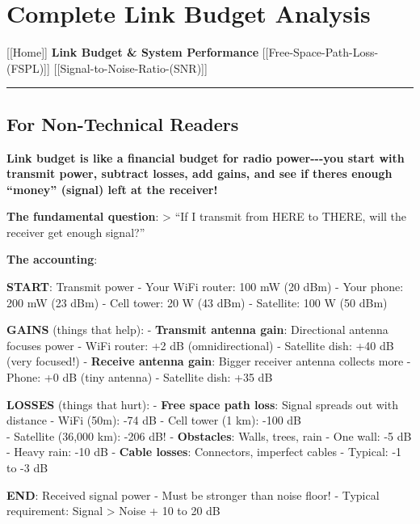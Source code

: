 \section{Complete Link Budget
Analysis}\label{complete-link-budget-analysis}

{[}{[}Home{]}{]} \textbar{} \textbf{Link Budget \& System Performance}
\textbar{} {[}{[}Free-Space-Path-Loss-(FSPL){]}{]} \textbar{}
{[}{[}Signal-to-Noise-Ratio-(SNR){]}{]}

\begin{center}\rule{0.5\linewidth}{0.5pt}\end{center}

\subsection{\texorpdfstring{ For Non-Technical
Readers}{ For Non-Technical Readers}}\label{for-non-technical-readers}

\textbf{Link budget is like a financial budget for radio power-\/-\/-you
start with transmit power, subtract losses, add gains, and see if
there\textquotesingle s enough ``money'' (signal) left at the receiver!}

\textbf{The fundamental question}: \textgreater{} ``If I transmit from
HERE to THERE, will the receiver get enough signal?''

\textbf{The accounting}:

\textbf{START}: Transmit power - Your WiFi router: 100 mW (20 dBm) -
Your phone: 200 mW (23 dBm) - Cell tower: 20 W (43 dBm) - Satellite: 100
W (50 dBm)

\textbf{GAINS} (things that help): - \textbf{ Transmit antenna gain}:
Directional antenna focuses power - WiFi router: +2 dB (omnidirectional)
- Satellite dish: +40 dB (very focused!) - \textbf{ Receive antenna
gain}: Bigger receiver antenna collects more - Phone: +0 dB (tiny
antenna) - Satellite dish: +35 dB

\textbf{LOSSES} (things that hurt): - \textbf{ Free space path loss}:
Signal spreads out with distance - WiFi (50m): -74 dB - Cell tower (1
km): -100 dB\\
- Satellite (36,000 km): -206 dB! - \textbf{ Obstacles}: Walls, trees,
rain - One wall: -5 dB - Heavy rain: -10 dB - \textbf{ Cable losses}:
Connectors, imperfect cables - Typical: -1 to -3 dB

\textbf{END}: Received signal power - Must be stronger than noise floor!
- Typical requirement: Signal \textgreater{} Noise + 10 to 20 dB

